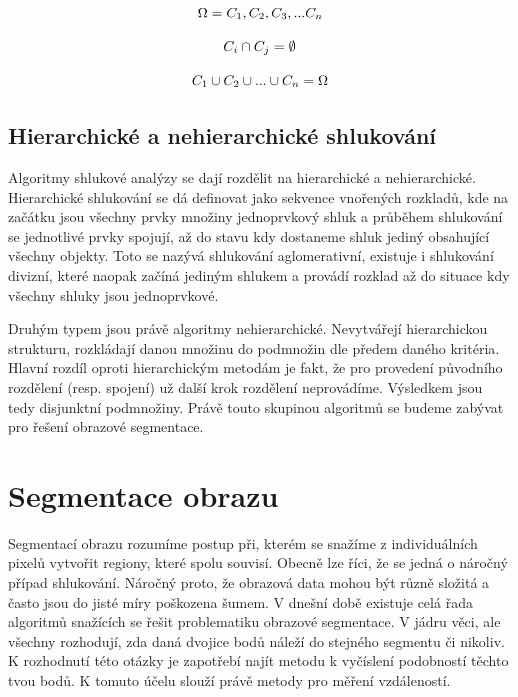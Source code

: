 \documentclass[czech, master, public, dept460, male, cpdeclaration, oneside]{diploma}
\begin{document}
\begin{equation}
\vspace*{+3.0mm}
\Omega = {C_1, C_2, C_3, ... C_n}
\end{equation}

\begin{equation}
\vspace*{+3.0mm}
C_i \cap C_j = \emptyset
\end{equation}

\begin{equation}
\vspace*{+3.0mm}
C_1 \cup C_2 \cup ... \cup C_n = \Omega
\end{equation}

\subsection{Hierarchické a nehierarchické shlukování}
Algoritmy shlukové analýzy se dají rozdělit na hierarchické a nehierarchické. Hierarchické shlukování se dá definovat jako sekvence vnořených rozkladů, kde na začátku jsou všechny prvky množiny jednoprvkový shluk a průběhem shlukování se jednotlivé prvky spojují, až do stavu kdy dostaneme shluk jediný obsahující všechny objekty. Toto se nazývá shlukování aglomerativní, existuje i shlukování divizní, které naopak začíná jediným shlukem a provádí rozklad až do situace kdy všechny shluky jsou jednoprvkové.\par
Druhým typem jsou právě algoritmy nehierarchické. Nevytvářejí hierarchickou strukturu, rozkládají danou množinu do podmnožin dle předem daného kritéria. Hlavní rozdíl oproti hierarchickým metodám je fakt, že pro provedení původního rozdělení (resp. spojení) už další krok rozdělení neprovádíme. Výsledkem jsou tedy disjunktní podmnožiny. Právě touto skupinou algoritmů se budeme zabývat pro řešení obrazové segmentace. \cite{Kumar}

\section{Segmentace obrazu}
Segmentací obrazu rozumíme postup při, kterém se snažíme z individuálních pixelů vytvořit regiony, které spolu souvisí. Obecně lze říci,  že se jedná o náročný případ shlukování. Náročný proto, že obrazová data mohou být různě složitá a často jsou do jisté míry poškozena šumem. V dnešní době existuje celá řada algoritmů snažících se řešit problematiku obrazové segmentace. V jádru věci, ale všechny rozhodují, zda daná dvojice bodů náleží do stejného segmentu či nikoliv. K rozhodnutí této otázky je zapotřebí najít metodu k vyčíslení podobností těchto tvou bodů. K tomuto účelu slouží právě metody pro měření vzdáleností. 
\end{document}
